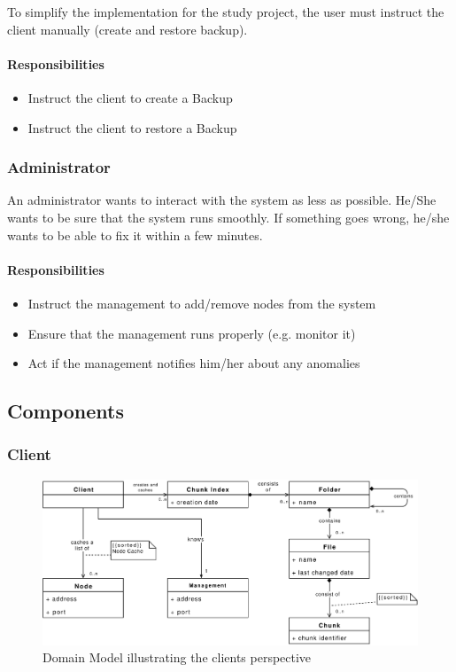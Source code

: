 To simplify the implementation for the study project, the \gls{user} must instruct the \gls{client} manually (create and restore backup).

\paragraph{Responsibilities}
\begin{itemize}
    \item Instruct the \gls{client} to create a Backup
    \item Instruct the \gls{client} to restore a Backup
\end{itemize}


\subsubsection{Administrator}
An \gls{administrator} wants to interact with the \gls{system} as less as possible. He/She wants to be sure that the \gls{system} runs smoothly. If something goes wrong, he/she wants to be able to fix it within a few minutes.

\paragraph{Responsibilities}
\begin{itemize}
    \item Instruct the \gls{management} to add/remove \glspl{node} from the \gls{system}
    \item Ensure that the \gls{management} runs properly (e.g. monitor it)
    \item Act if the \gls{management} notifies him/her about any anomalies
\end{itemize}

\subsection{Components}

\subsubsection{Client}
\label{sec:component-client}

\begin{figure}[h]
    \centering
    \includegraphics[width=1\linewidth]{resources/client_domain_model}
    \caption[Client Domain Model]{Domain Model illustrating the \glspl{client} perspective}
\end{figure}

